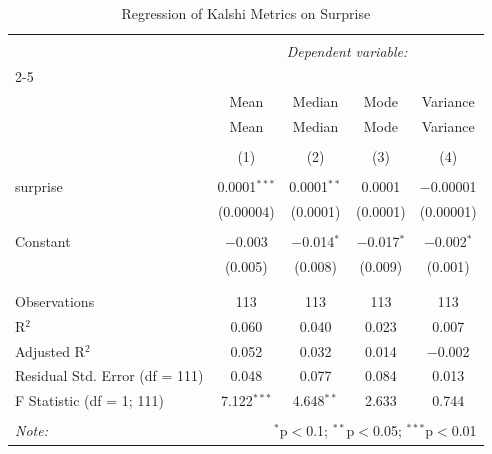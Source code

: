 
\begin{table}[!htbp] \centering 
  \caption{Regression of Kalshi Metrics on Surprise} 
  \label{} 
\begin{tabular}{@{\extracolsep{5pt}}lcccc} 
\\[-1.8ex]\hline 
\hline \\[-1.8ex] 
 & \multicolumn{4}{c}{\textit{Dependent variable:}} \\ 
\cline{2-5} 
\\[-1.8ex] & Mean & Median & Mode & Variance \\ 
 & Mean & Median & Mode & Variance \\ 
\\[-1.8ex] & (1) & (2) & (3) & (4)\\ 
\hline \\[-1.8ex] 
 surprise & 0.0001$^{***}$ & 0.0001$^{**}$ & 0.0001 & $-$0.00001 \\ 
  & (0.00004) & (0.0001) & (0.0001) & (0.00001) \\ 
  & & & & \\ 
 Constant & $-$0.003 & $-$0.014$^{*}$ & $-$0.017$^{*}$ & $-$0.002$^{*}$ \\ 
  & (0.005) & (0.008) & (0.009) & (0.001) \\ 
  & & & & \\ 
\hline \\[-1.8ex] 
Observations & 113 & 113 & 113 & 113 \\ 
R$^{2}$ & 0.060 & 0.040 & 0.023 & 0.007 \\ 
Adjusted R$^{2}$ & 0.052 & 0.032 & 0.014 & $-$0.002 \\ 
Residual Std. Error (df = 111) & 0.048 & 0.077 & 0.084 & 0.013 \\ 
F Statistic (df = 1; 111) & 7.122$^{***}$ & 4.648$^{**}$ & 2.633 & 0.744 \\ 
\hline 
\hline \\[-1.8ex] 
\textit{Note:}  & \multicolumn{4}{r}{$^{*}$p$<$0.1; $^{**}$p$<$0.05; $^{***}$p$<$0.01} \\ 
\end{tabular} 
\end{table} 
